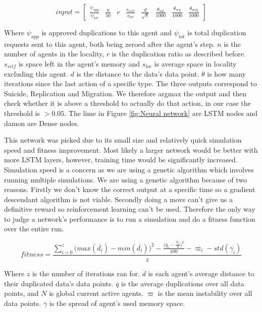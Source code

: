\documentclass{UoYCSproject}
\begin{document}
\begin{equation}
input = \begin{bmatrix} \frac{\psi_{app}}{\psi_{tot}} & \frac{n}{50} & r & \frac{s_{self}}{s_{loc}} & \frac{d}{\sqrt{8}} & \frac{\theta_{sui}}{1000} & \frac{\theta_{rep}}{1000} & \frac{\theta_{mig}}{1000} \end{bmatrix}
\end{equation}

Where $\psi_{app}$ is approved duplications to this agent and $\psi_{tot}$ is total duplication requests sent to this agent, both being zeroed after the agent's step. $n$ is the number of agents in the locality, $r$ is the duplication ratio as described before. $s_{self}$ is space left in the agent's memory and $s_{loc}$ is average space in locality excluding this agent. $d$ is the distance to the data’s data point. $\theta$ is how many iterations since the last action of a specific type. The three outputs correspond to Suicide, Replication and Migration. We therefore argmax the output and then check whether it is above a threshold to actually do that action, in our case the threshold is $>0.05$. The lime in Figure \ref{fig:Neural network} are LSTM nodes and damon are Dense nodes.

This network was picked due to its small size and relatively quick simulation speed and fitness improvement. Most likely a larger network would be better with more LSTM layers, however, training time would be significantly increased. Simulation speed is a concern as we are using a genetic algorithm which involves running multiple simulations. We are using a genetic algorithm because of two reasons. Firstly we don’t know the correct output at a specific time so a gradient descendant algorithm is not viable. Secondly doing a move can’t give us a definitive reward so reinforcement learning can’t be used. Therefore the only way to judge a network's performance is to run a simulation and do a fitness function over the entire run.

\begin{equation}
fitness = \frac{\sum_{i=0}^{z}{\big(max( \overline{d_{i}}) - min( \overline{d_{i}})\big)^{2} - \frac{\big( \overline{q}_{i} - \frac{N_{i}}{4} \big)^{2}}{100} } - \overline{ \varpi_{i} } - std( \overline{\gamma_{i}} )}{z}
\end{equation}

Where $z$ is the number of iterations ran for. $\overline{d}$ is each agent’s average distance to their duplicated data’s data points. $\overline{q}$ is the average duplications over all data points, and $N$ is global current active agents. $\overline{ \varpi }$ is the mean instability over all data points. $\overline{\gamma}$ is the spread of agent's used memory space.
\end{document}
